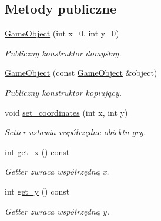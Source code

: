 \subsection*{Metody publiczne}
\begin{DoxyCompactItemize}
\item 
\hyperlink{classmodel_1_1GameObject_aec3d26647ae22d325282e07b4391de0a}{Game\+Object} (int x=0, int y=0)
\begin{DoxyCompactList}\small\item\em Publiczny konstruktor domyślny. \end{DoxyCompactList}\item 
\hyperlink{classmodel_1_1GameObject_add23441faffd638c0cba4950b8555364}{Game\+Object} (const \hyperlink{classmodel_1_1GameObject}{Game\+Object} \&object)
\begin{DoxyCompactList}\small\item\em Publiczny konstruktor kopiujący. \end{DoxyCompactList}\item 
\mbox{\label{classmodel_1_1GameObject_a3ed9274eb807ef622cf50ebe6126f297}} 
void \hyperlink{classmodel_1_1GameObject_a3ed9274eb807ef622cf50ebe6126f297}{set\+\_\+coordinates} (int x, int y)
\begin{DoxyCompactList}\small\item\em Setter ustawia współrzędne obiektu gry. \end{DoxyCompactList}\item 
\mbox{\label{classmodel_1_1GameObject_a7dd3d6798cbc6182908c8181114c8383}} 
int \hyperlink{classmodel_1_1GameObject_a7dd3d6798cbc6182908c8181114c8383}{get\+\_\+x} () const
\begin{DoxyCompactList}\small\item\em Getter zwraca współrzędną x. \end{DoxyCompactList}\item 
\mbox{\label{classmodel_1_1GameObject_ac883bfccb78ec3e689d1672755bf44f8}} 
int \hyperlink{classmodel_1_1GameObject_ac883bfccb78ec3e689d1672755bf44f8}{get\+\_\+y} () const
\begin{DoxyCompactList}\small\item\em Getter zwraca współrzędną y. \end{DoxyCompactList}\item 

\end{DoxyCompactItemize}
